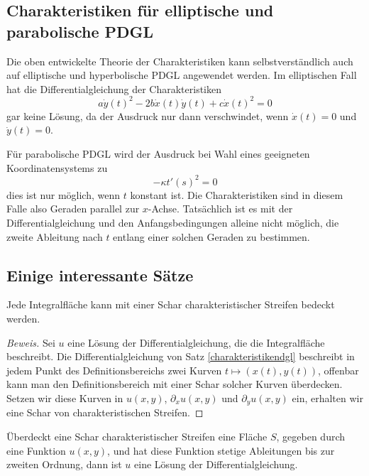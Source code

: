 \subsection{Charakteristiken für elliptische und parabolische PDGL}
Die oben entwickelte Theorie der Charakteristiken kann selbstverständlich
auch auf elliptische und hyperbolische PDGL angewendet werden.
Im elliptischen Fall hat die Differentialgleichung der Charakteristiken
\[
a\dot y(t)^2-2b\dot x(t)\dot y(t)+c\dot x(t)^2=0
\]
gar keine Lösung, da der Ausdruck nur dann verschwindet, wenn $\dot x(t)=0$
und $\dot y(t)=0$.

Für parabolische PDGL wird der Ausdruck bei Wahl eines geeigneten
Koordinatensystems zu
\[
-\kappa t'(s)^2=0
\]
dies ist nur möglich, wenn $t$ konstant ist. Die Charakteristiken
sind in diesem Falle also Geraden parallel zur $x$-Achse.
Tatsächlich ist es mit der Differentialgleichung und
den Anfangsbedingungen alleine nicht
möglich, die zweite Ableitung nach $t$ entlang einer solchen Geraden
zu bestimmen.

\subsection{Einige interessante Sätze}

\begin{satz}Jede Integralfläche kann mit einer Schar
charakteristischer Streifen bedeckt werden.
\end{satz}

\begin{proof}[Beweis]
Sei $u$ eine Lösung der Differentialgleichung, die die Integralfläche beschreibt.
Die Differentialgleichung von Satz \ref{charakteristikendgl}
beschreibt in jedem Punkt des Definitionsbereichs zwei Kurven $t\mapsto(x(t),y(t))$,
offenbar kann man den Definitionsbereich mit einer Schar solcher Kurven
überdecken.
Setzen wir diese Kurven in $u(x,y)$, $\partial_xu(x,y)$
und $\partial_yu(x,y)$ ein, erhalten wir eine Schar von charakteristischen
Streifen.
\end{proof}

\begin{satz}Überdeckt eine Schar charakteristischer Streifen
eine Fläche $S$, gegeben durch eine Funktion $u(x,y)$, und hat
diese Funktion stetige Ableitungen bis zur zweiten Ordnung,
dann ist $u$ eine Lösung der Differentialgleichung.
\end{satz}

